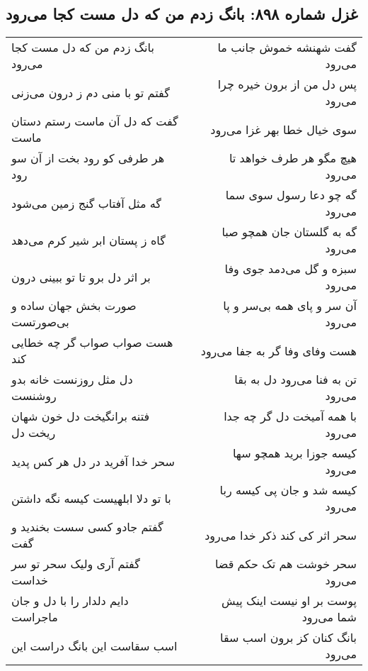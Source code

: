\begin{center}
\section*{غزل شماره ۸۹۸: بانگ زدم من که دل مست کجا می‌رود}
\label{sec:0898}
\begin{longtable}{l p{0.5cm} r}
بانگ زدم من که دل مست کجا می‌رود
&&
گفت شهنشه خموش جانب ما می‌رود
\\
گفتم تو با منی دم ز درون می‌زنی
&&
پس دل من از برون خیره چرا می‌رود
\\
گفت که دل آن ماست رستم دستان ماست
&&
سوی خیال خطا بهر غزا می‌رود
\\
هر طرفی کو رود بخت از آن سو رود
&&
هیچ مگو هر طرف خواهد تا می‌رود
\\
گه مثل آفتاب گنج زمین می‌شود
&&
گه چو دعا رسول سوی سما می‌رود
\\
گاه ز پستان ابر شیر کرم می‌دهد
&&
گه به گلستان جان همچو صبا می‌رود
\\
بر اثر دل برو تا تو ببینی درون
&&
سبزه و گل می‌دمد جوی وفا می‌رود
\\
صورت بخش جهان ساده و بی‌صورتست
&&
آن سر و پای همه بی‌سر و پا می‌رود
\\
هست صواب صواب گر چه خطایی کند
&&
هست وفای وفا گر به جفا می‌رود
\\
دل مثل روزنست خانه بدو روشنست
&&
تن به فنا می‌رود دل به بقا می‌رود
\\
فتنه برانگیخت دل خون شهان ریخت دل
&&
با همه آمیخت دل گر چه جدا می‌رود
\\
سحر خدا آفرید در دل هر کس پدید
&&
کیسه جوزا برید همچو سها می‌رود
\\
با تو دلا ابلهیست کیسه نگه داشتن
&&
کیسه شد و جان پی کیسه ربا می‌رود
\\
گفتم جادو کسی سست بخندید و گفت
&&
سحر اثر کی کند ذکر خدا می‌رود
\\
گفتم آری ولیک سحر تو سر خداست
&&
سحر خوشت هم تک حکم قضا می‌رود
\\
دایم دلدار را با دل و جان ماجراست
&&
پوست بر او نیست اینک پیش شما می‌رود
\\
اسب سقاست این بانگ دراست این
&&
بانگ کنان کز برون اسب سقا می‌رود
\\
\end{longtable}
\end{center}
